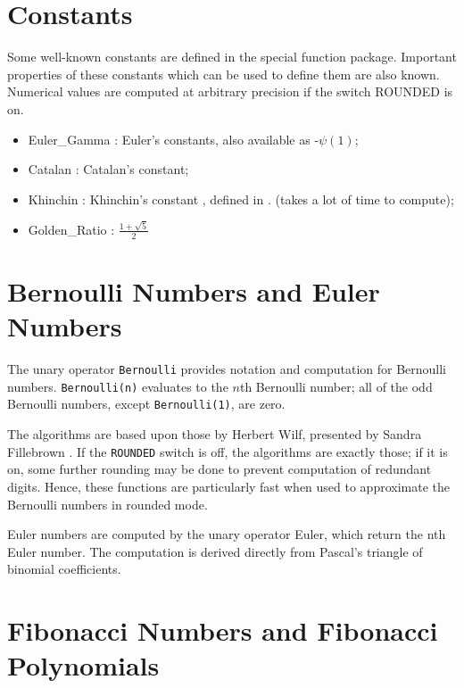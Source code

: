\documentclass[11pt]{article}
\begin{document}
\section{Constants}

Some well-known constants are defined in the special function package.
Important properties of these constants which can be used to define them
are also known. Numerical values are computed  at arbitrary precision
if the switch ROUNDED is on.

\begin{itemize}
\item Euler\_Gamma : Euler's constants, also available as -$\psi(1)$;
\item Catalan : Catalan's constant;
\item Khinchin : Khinchin's constant , defined in  \cite{Khinchin:64}.
 (takes a lot of time to compute);
\item Golden\_Ratio : $\frac{1 + \sqrt{5}}{2}$ 
\end{itemize}


\section{Bernoulli Numbers and Euler Numbers}

The unary operator {\tt Bernoulli} provides notation and computation for
Bernoulli numbers.  {\tt Bernoulli(n)} evaluates to the $n$th Bernoulli
number; all of the odd Bernoulli numbers, except {\tt Bernoulli(1)}, are
zero.

The algorithms are based upon those by Herbert Wilf, presented by Sandra
Fillebrown \cite{Fillebrown:92}.  If the {\tt ROUNDED} switch is off,
the algorithms are exactly those; if it is on, some further rounding may
be done to prevent computation of redundant digits.  Hence, these
functions are particularly fast when used to approximate the Bernoulli
numbers in rounded mode.

Euler numbers are computed by the unary operator Euler, which
return the nth Euler number. The computation is derived 
directly from Pascal's triangle of binomial coefficients.
 

\section{Fibonacci Numbers and Fibonacci Polynomials}
\end{document}

